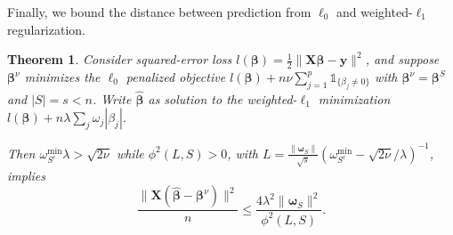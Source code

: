 \documentclass[12pt]{article}
\newtheorem{theorem}{\sc Theorem}[section]
\newcommand{\bs}[1]{\boldsymbol{#1}}
\newcommand{\mr}[1]{\mathrm{#1}}
\newcommand{\bm}[1]{\mathbf{#1}}
\newcommand{\ds}[1]{\mathds{#1}}
\begin{document}
\noindent Finally,  we bound the distance between prediction
from $\ell_0$ and weighted-$\ell_1$ regularization.  

\begin{theorem} \label{thm:sparseapprox}  Consider squared-error loss
$l(\bs{\beta}) =
\frac{1}{2}\|\bm{X}\bs{\beta}-\bm{y}\|^2$, and suppose $\bs{\beta}^{\nu}$ minimizes the $\ell_0$ penalized objective $l(\bs{\beta}) + n\nu\sum_{j=1}^p\ds{1}_{\{\beta_j\neq0\}}$ with $\bs{\beta}^\nu = \bs{\beta}^S$ and $|S|=s<n$.   
Write $\bs{\hat\beta}$ as solution to the weighted-$\ell_1$ minimization $l(\bs{\beta}) + n\lambda\sum_j\omega_j|\beta_j|$. 

Then  
$\omega^{\mr{min}}_{S^c}\lambda > \sqrt{2\nu}$ while $\phi^2(L,S) > 0$, with 
 $L = \frac{\|\bs{\omega}_S\|}{\sqrt{s}}\left(\omega^{\mr{min}}_{S^c}-\sqrt{2\nu}/\lambda\right)^{-1}$, implies
\begin{equation} \label{sparseineq}
\frac{\|\bm{X}(\bs{\hat\beta}-\bs{\beta}^\nu)\|^2}{n}\leq
\frac{4\lambda^2 \|\bs{\omega}_S\|^2}{\phi^2(L, S)}.
\end{equation} 
\end{theorem}
\end{document}
